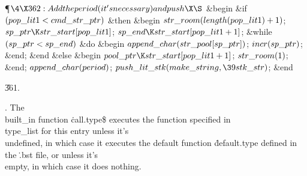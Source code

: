 \Y\P$\4\X362:Add the \\{period} (it's necessary) and push\X\S$\6
\&{begin} \&{if} $(\\{pop\_lit1}<\\{cmd\_str\_ptr})$ \1\&{then}\6
\&{begin} $\\{str\_room}(\\{length}(\\{pop\_lit1})+1)$;\5
$\\{sp\_ptr}\K\\{str\_start}[\\{pop\_lit1}]$;\5
$\\{sp\_end}\K\\{str\_start}[\\{pop\_lit1}+1]$;\6
\&{while} $(\\{sp\_ptr}<\\{sp\_end})$ \1\&{do}\6
\&{begin} $\\{append\_char}(\\{str\_pool}[\\{sp\_ptr}])$;\5
$\\{incr}(\\{sp\_ptr})$;\6
\&{end};\2\6
\&{end}\6
\4\&{else} \2\6
\&{begin} $\\{pool\_ptr}\K\\{str\_start}[\\{pop\_lit1}+1]$;\5
$\\{str\_room}(1)$;\6
\&{end};\5
$\\{append\_char}(\\{period})$;\5
$\\{push\_lit\_stk}(\\{make\_string},\39\\{stk\_str})$;\6
\&{end}\par
\U361.\fi

.
The \\{built\_in} function {\.{call.type\$}} executes the function
specified in \\{type\_list} for this entry unless it's \\{undefined}, in
which case it executes the default function \.{default.type} defined
in the \.{.bst} file, or unless it's \\{empty}, in which case it does
nothing.

